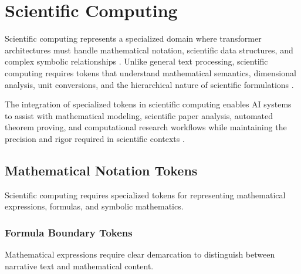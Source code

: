 
\section{Scientific Computing}

Scientific computing represents a specialized domain where transformer architectures must handle mathematical notation, scientific data structures, and complex symbolic relationships \citep{lewkowycz2022solving, lample2019deep}. Unlike general text processing, scientific computing requires tokens that understand mathematical semantics, dimensional analysis, unit conversions, and the hierarchical nature of scientific formulations \citep{trinh2024solving, yang2023leandojo}.
\begin{comment}
Feedback: This is a good start. To highlight the unique challenge, you could add: "Processing scientific text is not merely a matter of adding new vocabulary. It requires understanding a fundamentally different and more structured 'language' embedded within natural language—the language of mathematics and formal science, where symbols have precise, context-dependent meanings and relationships are governed by strict logical rules."
\end{comment}

The integration of specialized tokens in scientific computing enables AI systems to assist with mathematical modeling, scientific paper analysis, automated theorem proving, and computational research workflows while maintaining the precision and rigor required in scientific contexts \citep{azerbayev2023llemma, hendrycks2021measuring}.

\subsection{Mathematical Notation Tokens}

Scientific computing requires specialized tokens for representing mathematical expressions, formulas, and symbolic mathematics.

\subsubsection{Formula Boundary Tokens}

Mathematical expressions require clear demarcation to distinguish between narrative text and mathematical content.
\begin{comment}
Feedback: Before linking to the code, it's helpful to explain the motivation. For example: "A standard tokenizer would break a formula like `E=mc^2` into disconnected tokens (`e`, `=`, `m`, `c`, `^`, `2`), losing the critical semantic structure. By wrapping formulas in special tokens like `<MATH_START>` and `<MATH_END>`, the model learns to treat the content within as a distinct semantic unit, allowing it to apply a different 'mode' of processing that respects mathematical syntax."
\end{comment}

